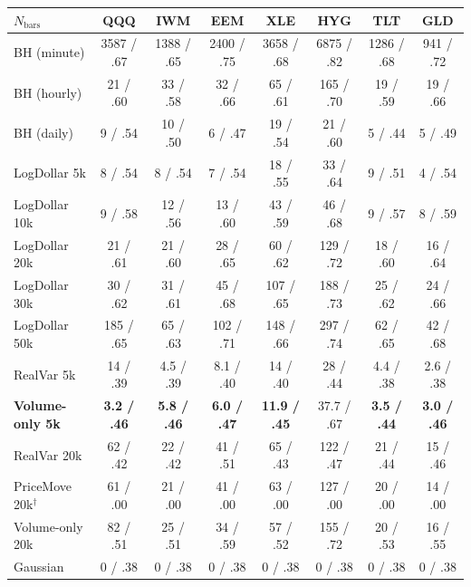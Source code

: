 \documentclass[11pt]{article}
\renewcommand{\arraystretch}{1.15}
\begin{document}
\smallskip
\renewcommand{\arraystretch}{1.1}
\setlength{\tabcolsep}{5pt}
\begin{footnotesize}
\begin{tabular}{@{}lccccccc@{}}
\toprule
$N_{\mathrm{bars}}$ & \textbf{QQQ} & \textbf{IWM} & \textbf{EEM} & \textbf{XLE} & \textbf{HYG} & \textbf{TLT} & \textbf{GLD} \\
\midrule
BH (minute)  & 3587 / .67 & 1388 / .65 & 2400 / .75 & 3658 / .68 & 6875 / .82 & 1286 / .68 & 941 / .72 \\
BH (hourly)  &   21 / .60 &   33 / .58 &   32 / .66 &   65 / .61 &  165 / .70 &   19 / .59 &  19 / .66 \\
BH (daily)   &    9 / .54 &   10 / .50 &    6 / .47 &   19 / .54 &   21 / .60 &    5 / .44 &   5 / .49 \\
\midrule
LogDollar 5k &    8 / .54 &    8 / .54 &    7 / .54 &   18 / .55 &   33 / .64 &    9 / .51 &   4 / .54 \\
LogDollar 10k&    9 / .58 &   12 / .56 &   13 / .60 &   43 / .59 &   46 / .68 &    9 / .57 &   8 / .59 \\
LogDollar 20k&   21 / .61 &   21 / .60 &   28 / .65 &   60 / .62 &  129 / .72 &   18 / .60 &  16 / .64 \\
LogDollar 30k&   30 / .62 &   31 / .61 &   45 / .68 &  107 / .65 &  188 / .73 &   25 / .62 &  24 / .66 \\
LogDollar 50k&  185 / .65 &   65 / .63 &  102 / .71 &  148 / .66 &  297 / .74 &   62 / .65 &  42 / .68 \\
\midrule
RealVar 5k & 14 / .39 & 4.5 / .39 & 8.1 / .40 & 14 / .40 & 28 / .44 & 4.4 / .38 & 2.6 / .38 \\
\textbf{Volume-only 5k} & \textbf{3.2 / .46} & \textbf{5.8 / .46} & \textbf{6.0 / .47} & \textbf{11.9 / .45} & 37.7 / .67 & \textbf{3.5 / .44} & \textbf{3.0 / .46} \\
RealVar 20k & 62 / .42 & 22 / .42 & 41 / .51 & 65 / .43 & 122 / .47 & 21 / .44 & 15 / .46 \\
PriceMove 20k$^{\dagger}$ &   61 / .00 &   21 / .00 &   41 / .00 &   63 / .00 &  127 / .00 &   20 / .00 &  14 / .00 \\
Volume-only 20k    &  82 / .51 &  25 / .51 &  34 / .59 &  57 / .52 & 155 / .72 &  20 / .53 & 16 / .55 \\
\midrule
Gaussian     &    0 / .38 &    0 / .38 &    0 / .38 &    0 / .38 &    0 / .38 &    0 / .38 &   0 / .38 \\
\bottomrule
\end{tabular}
\end{footnotesize}
\setlength{\tabcolsep}{6pt}
\end{document}
